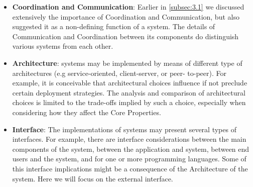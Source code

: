 \documentclass{sig-alternate}
\begin{document}
\begin{itemize}

\item \textbf{Coordination and Communication}: Earlier in
  \ref{subsec:3.1} we discussed extensively the importance of
  Coordination and Communication, but also suggested it as a
  non-defining function of a \pilot system.  The details of
  Communication and Coordination between its components do distinguish
  various \pilot systems from each other.

\item \textbf{Architecture}: \pilot systems may be implemented by
  means of different type of architectures (e.g service-oriented,
  client-server, or peer- to-peer). For example, it is conceivable
  that architectural choices influence if not preclude certain
  deployment strategies. The analysis and comparison of architectural
  choices is limited to the trade-offs implied by such a choice,
  especially when considering how they affect the Core Properties.




\item \textbf{Interface}: The implementations of \pilot systems may present
  several types of interfaces. For example, there are interface considerations
  between the main components of the \pilot system, between the application and
  \pilot system, between end users and the \pilot system, and for one or more
  programming languages. Some of this interface implications might be a
  consequence of the Architecture of the \pilot system.
  Here we will focus on the external interface.


\end{itemize}
\end{document}
